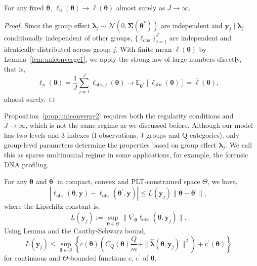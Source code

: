 \begin{proposition}
    For any fixed $\bm{\theta}$, $\ell_{n}\left(\bm{\theta}\right)\to \bar{\ell}\left(\bm{\theta}\right)$ almost surely as $J\to \infty$.
    \label{prop:uniconverge2}
\end{proposition}

\begin{proof}
    Since the group effect $\bm{\lambda}_{j}\sim \mathcal{N}\left(0,\bm{\Sigma}(\bm{\theta}^{*})\right)$ are independent and $\bm{y}_{j}\mid \bm{\lambda}_{j}$ conditionally independent of other groups, $\{\ell_{\text{obs}}\}_{j=1}^{J}$ are independent and identically distributed across group $j$. With finite mean $\bar{\ell}\left(\bm{\theta}\right)$ by Lemma~\ref{lem:uniconverge1}, we apply the strong law of large numbers directly, that is,
    \begin{equation*}
        \ell_{n}\left(\bm{\theta}\right)=\dfrac{1}{J}\sum_{j=1}^{J} \ell_{\text{obs}, j}\left(\bm{\theta}\right)\to \mathbb{E}_{\bm{\theta}^{*}}[\ell_{\text{obs}}(\bm{\theta})]=\bar{\ell}\left(\bm{\theta}\right),
    \end{equation*}
    almost surely.
\end{proof}

Proposition~\ref{prop:uniconverge2} requires both the regularity conditions and $J\to\infty$, which is not the same regime as we discussed before. Although our model has two levels and 3 indexes (I observations, J groups and Q categories), only group-level parameters determine the properties based on group effect $\bm{\lambda}_{j}$. We call this as sparse multinomial regime in some applications, for example, the forensic DNA profiling.

\begin{lemma}
    For any $\bm{\theta}$ and $\bm{\theta}^{'}$ in compact, convex and PLT-constrained space $\Theta$, we have,
    \begin{equation*}
        |\ell_{\text{obs}}\left(\bm{\theta},\bm{y}\right)-\ell_{\text{obs}}\left(\bm{\theta}^{'},\bm{y}\right)|\leq L(\bm{y}_{j})\|\bm{\theta}-\bm{\theta}^{'}\|,
    \end{equation*}
    where the Lipschitz constant is,
    \begin{equation*}
        L(\bm{y}_{j}):=\sup_{\bm{\theta}\in \Theta}\|\nabla_{\bm{\theta}}\ell_{\text{obs}}\left(\bm{\theta},\bm{y}_{j}\right)\|.
    \end{equation*}
    Using Lemma and the Cauthy-Schwarz bound,
    \begin{equation*}
        L(\bm{y}_{j})\leq \sup_{\bm{\theta}\in \Theta}\left\{c(\bm{\theta})\left(C_{Q}(\bm{\theta})\dfrac{Q}{m}+\|\hat{\bm{\lambda}}(\bm{\theta},\bm{y}_{j})\|^{2}\right)+c^{'}(\bm{\theta})\right\}
    \end{equation*}
    for continuous and $\Theta$-bounded functions $c$, $c^{'}$ of $\bm{\theta}$.
\end{lemma}

